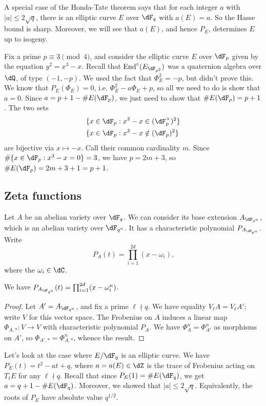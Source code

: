 A special case of the Honda-Tate theorem says that for each integer $a$ with 
$|a|\leqslant 2\sqrt{q}$, there is an elliptic curve $E$ over $\dF_q$ with 
$a(E)=a$. So the Hasse bound is sharp. Moreover, we will see that $a(E)$, and 
hence $P_E$, determines $E$ up to isogeny. 

\begin{example}
Fix a prime $p\equiv 3\pmod 4$, and consider the elliptic curve $E$ over 
$\dF_p$ given by the equation $y^2=x^3-x$. Recall that 
$\End^\circ(E_{\dF_{p^2}})$ was a quaternion algebra over $\dQ$, of type 
$(-1,-p)$. We used the fact that $\Phi_E^2=-p$, but didn't prove this. We 
know that $P_E(\Phi_E)=0$, i.e. $\Phi_E^2-a \Phi_E+p$, so all we need to do 
is show that $a=0$. Since $a=p+1-\# E(\dF_p)$, we just need to show that 
$\# E(\dF_p)=p+1$. The two sets 
\begin{align*}
  \{x\in \dF_p &: x^3-x\in (\dF_p^\times)^2\} \\
  \{x\in \dF_p &: x^3-x\notin (\dF_p)^2\}
\end{align*}
are bijective via $x\mapsto -x$. Call their common cardinality $m$. 
Since $\#\{x\in \dF_p:x^3-x=0\} = 3$, we have $p=2 m+3$, so 
$\# E(\dF_p)=2 m+3+1=p+1$. 
\end{example}


\subsection{Zeta functions}

Let $A$ be an abelian variety over $\dF_q$. We can consider its base extension 
$A_{\dF_{q^n}}$, which is an abelian variety over $\dF_{q^n}$. It has a 
characteristic polynomial $P_{A_{\dF_{p^n}}}$. Write 
\[
  P_A(t) = \prod_{i=1}^{2 d} (x-\omega_i) \text{,}
\]
where the $\omega_i\in \dC$. 

\begin{theorem}\label{thm:char-poly-power}
We have $P_{A_{\dF_{q^n}}}(t) = \prod_{i=1}^{2 d} (x-\omega_i^n)$. 
\end{theorem}
\begin{proof}
Let $A'=A_{\dF_{q^n}}$, and fix a prime $\ell\nmid q$. We have equality 
$V_\ell A = V_\ell A'$; write $V$ for this vector space. The Frobenius 
on $A$ induces a linear map $\Phi_{A,\ast}:V\to V$ with characteristic 
polynomial $P_A$. We have $\Phi_A^n=\Phi_{A'}^n$ as morphisms on $A'$, so 
$\Phi_{A',\ast} = \Phi_{A,\ast}^n$, whence the result. 
\end{proof}

Let's look at the case where $E/\dF_q$ is an elliptic curve. We have 
$P_E(t)=t^2-a t+q$, where $a=a(E)\in \dZ$ is the trace of Frobenius acting on 
$T_\ell E$ for any $\ell\nmid q$. Recall that since $P_E(1)=\# E(\dF_q)$, we 
get $a=q+1-\# E(\dF_q)$. Moreover, we showed that $|a|\leqslant 2\sqrt q$. 
Equivalently, the roots of $P_E$ have absolute value $q^{1/2}$. 


